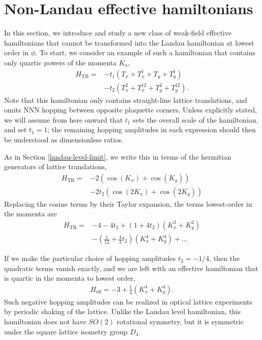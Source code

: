 \documentclass[aps,prb,twocolumn,letterpaper,twoside,nobalancelastpage,groupedaddress,amsmath,amssymb,floatfix,citeautoscript]{revtex4-1}
\begin{document}
\section{Non-Landau effective hamiltonians}
In this section, we introduce and study a new class of weak-field effective hamiltonians that cannot be transformed into the Landau hamiltonian at lowest order in $\phi$. To start, we consider an example of such a hamiltonian that contains only quartic powers of the momenta $K_a$,
\begin{align}
\label{quartic-harper}
H_{\text{TB}} = &-t_1 \left(T_x + T_x^{\dag} + T_y + T_y^{\dag}\right)\nonumber\\ &- t_2 \left(T_x^{2} + T_x^{\dag 2} + T_y^{2} + T_y^{\dag 2}\right).
\end{align}
Note that this hamiltonian only contains straight-line lattice translations, and omits NNN hopping between opposite plaquette corners. Unless explicitly stated, we will assume from here onward that $t_1$ sets the overall scale of the hamiltonian, and set $t_1=1$; the remaining hopping amplitudes in each expression should then be understood as dimensionless ratios.

As in Section \ref{landau-level-limit}, we write this in terms of the hermitian generators of lattice translations,
\begin{align*}
H_{\text{TB}} = &-2\left(\cos(K_x) + \cos(K_y)\right)\\ &- 2t_2\left(\cos(2K_x) + \cos(2K_y)\right)
\end{align*}
Replacing the cosine terms by their Taylor expansion, the terms lowest-order in the momenta are 
\begin{align*}
H_{\text{TB}} = &-4 - 4 t_2 + (1 + 4t_2) \left(K_x^2 + K_y^2\right) \\
&- \left(\frac{1}{12} + \frac{4}{3}t_2\right) \left(K_x^4 + K_y^4\right) + \ldots
\end{align*}

If we make the particular choice of hopping amplitudes $t_2 = -1/4$, then the quadratic terms vanish exactly, and we are left with an effective hamiltonian that is quartic in the momenta to lowest order,
\begin{align}
\label{hamiltonian-quartic-effective}
H_{\text{eff}} = -3 + \frac{1}{4} \left(K_x^4 + K_y^4\right).
\end{align}
Such negative hopping amplitudes can be realized in optical lattice experiments by periodic shaking of the lattice\cite{eckardt_colloquium_2017}. Unlike the Landau level hamiltonian, this hamiltonian does not have $SO(2)$ rotational symmetry, but it is symmetric under the square lattice isometry group $D_4$. 
\end{document}
